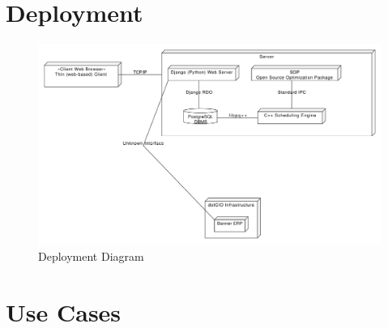 \documentclass[11pt]{article}
\begin{document}
\section{Deployment} %


\begin{figure}[ht]
	\centering
		\includegraphics[width = \textwidth]{deploymentdiagram.pdf}
	\caption{Deployment Diagram}
	\label{fig:Deploy}
\end{figure}


\section{Use Cases} %
\end{document}
